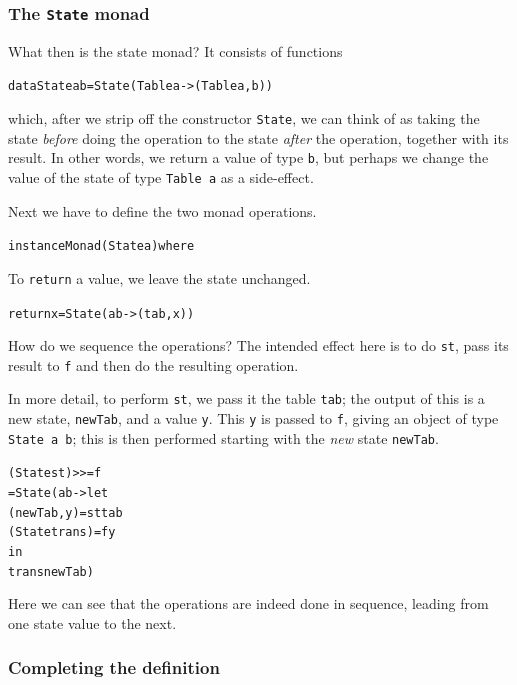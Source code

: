 \subsubsection*{The \texttt{State} monad}

What then is the state monad? It consists of functions
\begin{alltt}
data State a b = State (Table a -> (Table a , b))
\end{alltt}
which, after we strip off the constructor \texttt{State},
we can think of as taking the state {\em before\/} doing the operation
to the state {\em after\/} the operation, together with its result. In other
words, we return a value of type \texttt{b}, but perhaps we change the value of
the state of type \texttt{Table a} as a side-effect.

Next we have to define the two monad operations.
\begin{alltt}
instance Monad (State a) where
\end{alltt}
To \texttt{return} a value, we leave the state
unchanged.
\begin{alltt}
  return x = State (ab -> (tab,x))
\end{alltt}
How do we sequence the operations?
The intended effect here is to do \texttt{st}, pass its result to \texttt{f}
and then do the resulting operation.

In more detail, to perform \texttt{st}, we pass it the table \texttt{tab}; the output of this is a
new state, \texttt{newTab}, and a value \texttt{y}. This \texttt{y} is passed to 
\texttt{f}, giving an object of type \texttt{State~a~b}; this is then performed starting
with the {\em new\/} state \texttt{newTab}. 
\begin{alltt}
  (State st) >>= f 
    = State (ab -> let 
                     (newTab,y)    = st tab
                     (State trans) = f y 
                     in
                     trans newTab)
\end{alltt}
Here we can see that the operations are
indeed done in sequence, leading from one state value to the next.

\subsubsection*{Completing the definition}


